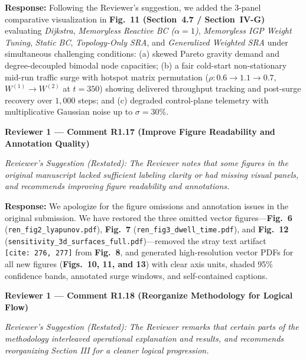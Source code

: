 \documentclass[11pt,a4paper]{article}
\newcommand{\cbox}[2]{%
  \vspace{0.6em}\noindent\textbf{#1}\par\smallskip
  \noindent\textit{Reviewer's Suggestion (Restated):} \textit{#2}\par\smallskip
}
\begin{document}
\noindent\textbf{Response:} Following the Reviewer's suggestion, we added the 3-panel comparative visualization in \textbf{Fig.~11 (Section~4.7 / Section~IV-G)} evaluating \textit{Dijkstra}, \textit{Memoryless Reactive BC ($\alpha=1$)}, \textit{Memoryless IGP Weight Tuning}, \textit{Static BC}, \textit{Topology-Only SRA}, and \textit{Generalized Weighted SRA} under simultaneous challenging conditions: (a) skewed Pareto gravity demand and degree-decoupled bimodal node capacities; (b) a fair cold-start non-stationary mid-run traffic surge with hotspot matrix permutation ($\rho: 0.6 \to 1.1 \to 0.7$, $W^{(1)}\to W^{(2)}$ at $t=350$) showing delivered throughput tracking and post-surge recovery over $1{,}000$ steps; and (c) degraded control-plane telemetry with multiplicative Gaussian noise up to $\sigma = 30\%$.

\hrulefill

\cbox{Reviewer 1 --- Comment R1.17 (Improve Figure Readability and Annotation Quality)}{The Reviewer notes that some figures in the original manuscript lacked sufficient labeling clarity or had missing visual panels, and recommends improving figure readability and annotations.}

\noindent\textbf{Response:} We apologize for the figure omissions and annotation issues in the original submission. We have restored the three omitted vector figures---\textbf{Fig.~6} (\texttt{ren\_fig2\_lyapunov.pdf}), \textbf{Fig.~7} (\texttt{ren\_fig3\_dwell\_time.pdf}), and \textbf{Fig.~12} (\texttt{sensitivity\_3d\_surfaces\_full.pdf})---removed the stray text artifact \texttt{[cite:\ 276, 277]} from \textbf{Fig.~8}, and generated high-resolution vector PDFs for all new figures (\textbf{Figs.~10, 11, and 13}) with clear axis units, shaded 95\% confidence bands, annotated surge windows, and self-contained captions.

\hrulefill

\cbox{Reviewer 1 --- Comment R1.18 (Reorganize Methodology for Logical Flow)}{The Reviewer remarks that certain parts of the methodology interleaved operational explanation and results, and recommends reorganizing Section III for a cleaner logical progression.}
\end{document}
